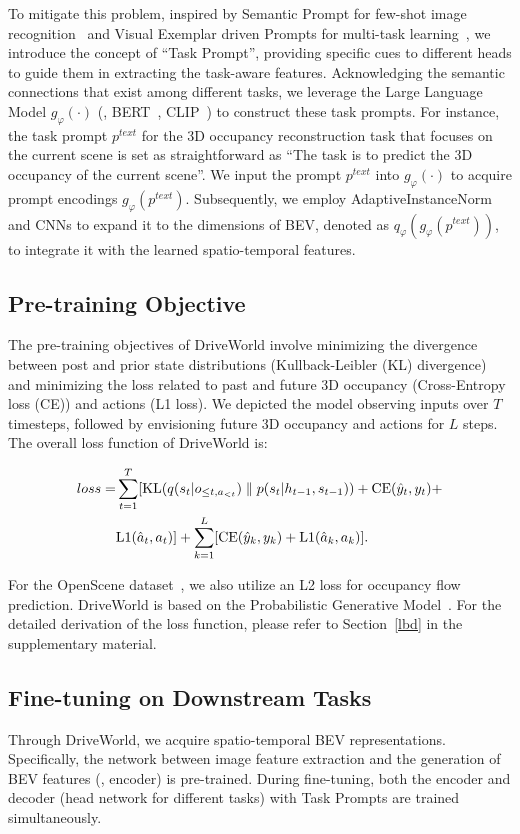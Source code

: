 To mitigate this problem, inspired by Semantic Prompt for few-shot image recognition~\cite{sp} and Visual Exemplar
driven Prompts for multi-task learning~\cite{liang2023visual}, we introduce the concept of ``Task Prompt'', providing specific cues to different heads to guide them in extracting the task-aware features. Acknowledging the semantic connections that exist among different tasks, we leverage the Large Language Model $g_\varphi (\cdotp )$ (\eg, BERT~\cite{bert}, CLIP~\cite{clip}) to construct these task prompts. For instance, the task prompt $p^{text}$ for the 3D occupancy reconstruction task that focuses on the current scene is set as straightforward as ``The task is to predict the 3D occupancy of the current scene''. We input the prompt $p^{text}$ into $g_\varphi (\cdotp)$ to acquire prompt encodings $g_\varphi (p^{text})$. Subsequently, we employ AdaptiveInstanceNorm~\cite{mile} and CNNs to expand it to the dimensions of BEV, denoted as $q_\varphi(g_\varphi (p^{text}))$, to integrate it with the learned spatio-temporal features.

\subsection{Pre-training Objective}
The pre-training objectives of DriveWorld involve minimizing the divergence between post and prior state distributions (\ie Kullback-Leibler (KL) divergence) and minimizing the loss related to past and future 3D occupancy (\ie Cross-Entropy loss (CE)) and actions (\ie L1 loss). 
We depicted the model observing inputs over $T$ timesteps, followed by envisioning future 3D occupancy and actions for $L$ steps. The overall loss function of DriveWorld is:

\begin{scriptsize }
\begin{equation} \label{loss}
\begin{aligned}
loss =&\displaystyle\sum_{t=1}^{T}[{\rm KL}(q(s_t|o_{\leq t,a_{<t}})\parallel p(s_t|h_{t-1},s_{t-1}))+{\rm CE}(\hat{y}_t,y_t)+\\
&{\rm L1}(\hat{a}_t,a_t)]
+\displaystyle\sum_{k=1}^{L}[{\rm CE}(\hat{y}_k,y_k)+{\rm L1}(\hat{a}_k,a_k)].
\end{aligned}
\end{equation}
\end{scriptsize }

For the OpenScene dataset~\cite{openscene}, we also utilize an L2 loss for occupancy flow prediction.
DriveWorld is based on the Probabilistic Generative Model~\cite{vae,dreamerv2,mile}.
For the detailed derivation of the loss function, please refer to Section~\ref{lbd} in the supplementary material. 

\subsection{Fine-tuning on Downstream Tasks}
Through DriveWorld, we acquire spatio-temporal BEV representations. Specifically, the network between image feature extraction and the generation of BEV features (\ie, encoder) is pre-trained. During fine-tuning, both the encoder and decoder (\ie head network for different tasks) with Task Prompts are trained simultaneously.
